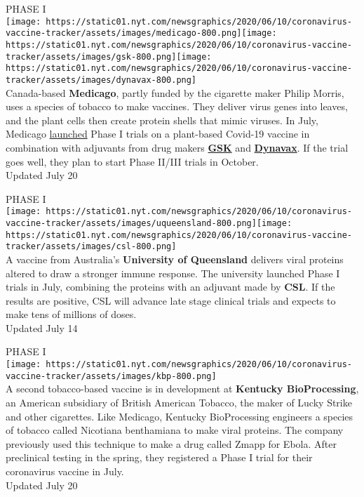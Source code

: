 PHASE I\\
\texttt{[image: https://static01.nyt.com/newsgraphics/2020/06/10/coronavirus-vaccine-tracker/assets/images/medicago-800.png]}\texttt{[image: https://static01.nyt.com/newsgraphics/2020/06/10/coronavirus-vaccine-tracker/assets/images/gsk-800.png]}\texttt{[image: https://static01.nyt.com/newsgraphics/2020/06/10/coronavirus-vaccine-tracker/assets/images/dynavax-800.png]}\\
Canada-based \textbf{Medicago}, partly funded by the cigarette maker
Philip Morris, uses a species of tobacco to make vaccines. They deliver
virus genes into leaves, and the plant cells then create protein shells
that mimic viruses. In July, Medicago
\href{https://www.medicago.com/en/newsroom/medicago-begins-phase-i-clinical-trials-for-its-covid-19-vaccine-candidate/}{launched}
Phase I trials on a plant-based Covid-19 vaccine in combination with
adjuvants from drug makers
\textbf{\href{https://www.medicago.com/en/newsroom/gsk-and-medicago-announce-collaboration-to-develop-a-novel-adjuvanted-covid-19-candidate-vaccine/}{GSK}}
and
\textbf{\href{https://www.medicago.com/en/newsroom/dynavax-and-medicago-announce-collaboration-to-develop-a-novel-adjuvanted-covid-19-vaccine-candidate/}{Dynavax}}.
If the trial goes well, they plan to start Phase II/III trials in
October.\\
Updated July 20

PHASE I\\
\texttt{[image: https://static01.nyt.com/newsgraphics/2020/06/10/coronavirus-vaccine-tracker/assets/images/uqueensland-800.png]}\texttt{[image: https://static01.nyt.com/newsgraphics/2020/06/10/coronavirus-vaccine-tracker/assets/images/csl-800.png]}\\
A vaccine from Australia's \textbf{University of Queensland} delivers
viral proteins altered to draw a stronger immune response. The
university launched Phase I trials in July, combining the proteins with
an adjuvant made by \textbf{CSL}. If the results are positive, CSL will
advance late stage clinical trials and expects to make tens of millions
of doses.\\
Updated July 14

PHASE I\\
\texttt{[image: https://static01.nyt.com/newsgraphics/2020/06/10/coronavirus-vaccine-tracker/assets/images/kbp-800.png]}\\
A second tobacco-based vaccine is in development at \textbf{Kentucky
BioProcessing}, an American subsidiary of British American Tobacco, the
maker of Lucky Strike and other cigarettes. Like Medicago, Kentucky
BioProcessing engineers a species of tobacco called Nicotiana
benthamiana to make viral proteins. The company previously used this
technique to make a drug called Zmapp for Ebola. After preclinical
testing in the spring, they registered a Phase I trial for their
coronavirus vaccine in July.\\
Updated July 20

